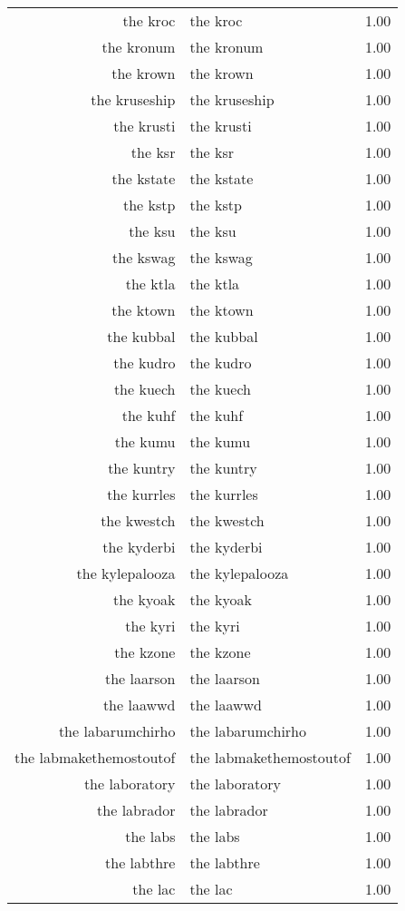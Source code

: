 \begin{table}[ht]
\begin{tabular}{rlr}
  the kroc & the kroc & 1.00 \\ 
  the kronum & the kronum & 1.00 \\ 
  the krown & the krown & 1.00 \\ 
  the kruseship & the kruseship & 1.00 \\ 
  the krusti & the krusti & 1.00 \\ 
  the ksr & the ksr & 1.00 \\ 
  the kstate & the kstate & 1.00 \\ 
  the kstp & the kstp & 1.00 \\ 
  the ksu & the ksu & 1.00 \\ 
  the kswag & the kswag & 1.00 \\ 
  the ktla & the ktla & 1.00 \\ 
  the ktown & the ktown & 1.00 \\ 
  the kubbal & the kubbal & 1.00 \\ 
  the kudro & the kudro & 1.00 \\ 
  the kuech & the kuech & 1.00 \\ 
  the kuhf & the kuhf & 1.00 \\ 
  the kumu & the kumu & 1.00 \\ 
  the kuntry & the kuntry & 1.00 \\ 
  the kurrles & the kurrles & 1.00 \\ 
  the kwestch & the kwestch & 1.00 \\ 
  the kyderbi & the kyderbi & 1.00 \\ 
  the kylepalooza & the kylepalooza & 1.00 \\ 
  the kyoak & the kyoak & 1.00 \\ 
  the kyri & the kyri & 1.00 \\ 
  the kzone & the kzone & 1.00 \\ 
  the laarson & the laarson & 1.00 \\ 
  the laawwd & the laawwd & 1.00 \\ 
  the labarumchirho & the labarumchirho & 1.00 \\ 
  the labmakethemostoutof & the labmakethemostoutof & 1.00 \\ 
  the laboratory & the laboratory & 1.00 \\ 
  the labrador & the labrador & 1.00 \\ 
  the labs & the labs & 1.00 \\ 
  the labthre & the labthre & 1.00 \\ 
  the lac & the lac & 1.00 \\ 

\end{tabular}
\end{table}
